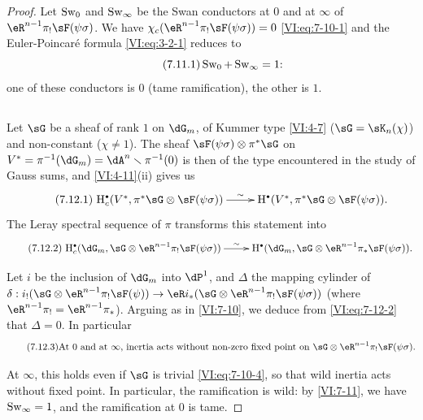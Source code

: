 \begin{proof}[Proof]
Let $\operatorname{Sw}_0$ and $\operatorname{Sw}_\infty$ be the Swan conductors at $0$ and at
$\infty$ of $\eR^{n-1} \pi_! \sF(\psi\sigma)$. We have
$\chi_c(\eR^{n-1} \pi_! \sF(\psi\sigma))=0$ \eqref{VI:eq:7-10-1} and the
Euler-Poincaré formula \eqref{VI:eq:3-2-1} reduces to 
\begin{equation*}\tag{7.11.1}\label{VI:eq:7-11-1}
  \operatorname{Sw}_0 + \operatorname{Sw}_\infty =1 \text{:} 
\end{equation*}
one of these conductors is $0$ (tame ramification), the other is $1$. 





\subsection{}\label{VI:7-12}

Let $\sG$ be a sheaf of rank $1$ on $\dG_m$, of Kummer type
\ref{VI:4-7} ($\sG=\sK_n(\chi)$) and non-constant ($\chi\ne 1$). The sheaf
$\sF(\psi\sigma)\otimes \pi^\ast \sG$ on
$V^\ast=\pi^{-1}(\dG_m) = \dA^n\setminus \pi^{-1}(0)$ is then of the type
encountered in the study of Gauss sums, and \ref{VI:4-11}(ii) gives us 
\begin{equation*}\tag{7.12.1}\label{VI:eq:7-12-1}
\xymatrix{
  \h_c^\bullet(V^\ast,\pi^\ast\sG\otimes \sF(\psi\sigma)) \ar[r]^-\sim 
    & \h^\bullet(V^\ast,\pi^\ast \sG\otimes \sF(\psi\sigma)) \text{.} 
}
\end{equation*}
The Leray spectral sequence of $\pi$ transforms this statement into 
\begin{equation*}\tag{7.12.2}\label{VI:eq:7-12-2}
\xymatrix{
  \h_c^\bullet(\dG_m,\sG\otimes \eR^{n-1} \pi_! \sF(\psi\sigma)) \ar[r]^-\sim 
    & \h^\bullet(\dG_m,\sG\otimes \eR^{n-1} \pi_\ast \sF(\psi\sigma)) \text{.} 
}
\end{equation*}

Let $i$ be the inclusion of $\dG_m$ into $\dP^1$, and $\Delta$ the mapping cylinder
of
$\delta:i_!(\sG\otimes \eR^{n-1}\pi_! \sF(\psi))\to \eR i_\ast (\sG\otimes \eR^{n-1} \pi_! \sF(\psi\sigma))$
(where $\eR^{n-1} \pi_! = \eR^{n-1}\pi_\ast$). Arguing as in
\ref{VI:7-10}, we deduce from \eqref{VI:eq:7-12-2} that $\Delta=0$. In
particular 
\begin{equation*}\tag{7.12.3}\label{VI:eq:7-12-3}
  \text{At $0$ and at $\infty$, inertia acts without non-zero fixed point on $\sG\otimes \eR^{n-1}\pi_! \sF(\psi\sigma)$.}
\end{equation*}

At $\infty$, this holds even if $\sG$ is trivial \eqref{VI:eq:7-10-4}, so
that wild inertia acts without fixed point. In particular, the
ramification is wild: by \ref{VI:7-11}, we have $\operatorname{Sw}_\infty=1$, and the
ramification at $0$ is tame.


\end{proof}

